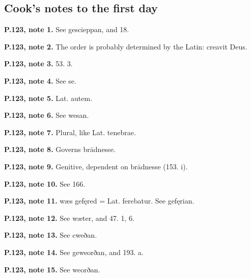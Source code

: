 \subsection*{Cook’s notes to the first day}

\textbf{P.123, note 1.} See gescieppan, and 18.

\textbf{P.123, note 2.} The order is probably determined by the Latin: creavit Deus.

\textbf{P.123, note 3.} 53. 3.

\textbf{P.123, note 4.} See se.

\textbf{P.123, note 5.} Lat. autem.

\textbf{P.123, note 6.} See wesan.

\textbf{P.123, note 7.} Plural, like Lat. tenebrae.

\textbf{P.123, note 8.} Governs brādnesse.

\textbf{P.123, note 9.} Genitive, dependent on brādnesse (153. i).

\textbf{P.123, note 10.} See 166.

\textbf{P.123, note 11.} wæs gefęred = Lat. ferebatur. See gefęrian.

\textbf{P.123, note 12.} See wæter, and 47. 1, 6.

\textbf{P.123, note 13.} See cweðan.

\textbf{P.123, note 14.} See geweorðan, and 193. a.

\textbf{P.123, note 15.} See weorðan.


